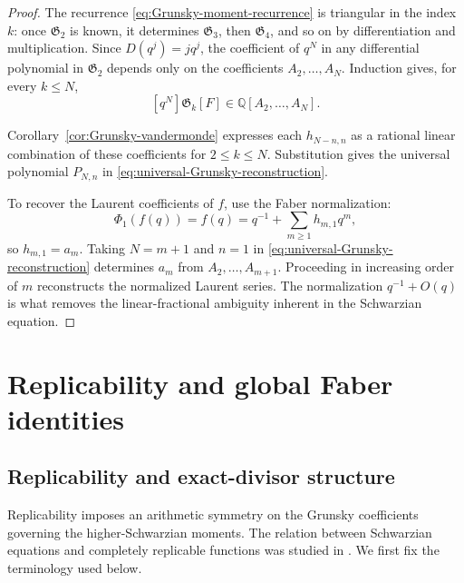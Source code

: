 \documentclass[11pt]{amsart}
\theoremstyle{definition}
\theoremstyle{remark}
\numberwithin{equation}{section}
\begin{document}
\begin{proof}
The recurrence \eqref{eq:Grunsky-moment-recurrence} is triangular in the index $k$: once $\mathfrak G_2$ is known, it determines $\mathfrak G_3$, then $\mathfrak G_4$, and so on by differentiation and multiplication. Since $D(q^j)=jq^j$, the coefficient of $q^N$ in any differential polynomial in $\mathfrak G_2$ depends only on the coefficients $A_2,\ldots,A_N$. Induction gives, for every $k\leq N$,
\[
[q^N]\mathfrak G_k[F]\in\mathbb Q[A_2,\ldots,A_N].
\]

Corollary~\ref{cor:Grunsky-vandermonde} expresses each $h_{N-n,n}$ as a rational linear combination of these coefficients for $2\leq k\leq N$. Substitution gives the universal polynomial $P_{N,n}$ in \eqref{eq:universal-Grunsky-reconstruction}.

To recover the Laurent coefficients of $f$, use the Faber normalization:
\[
\Phi_1(f(q))=f(q)=q^{-1}+\sum_{m\geq1}h_{m,1}q^m,
\]
so $h_{m,1}=a_m$. Taking $N=m+1$ and $n=1$ in \eqref{eq:universal-Grunsky-reconstruction} determines $a_m$ from $A_2,\ldots,A_{m+1}$. Proceeding in increasing order of $m$ reconstructs the normalized Laurent series. The normalization $q^{-1}+O(q)$ is what removes the linear-fractional ambiguity inherent in the Schwarzian equation.
\end{proof}

\section{Replicability and global Faber identities}\label{sec:replicability}

\subsection{Replicability and exact-divisor structure}
Replicability imposes an arithmetic symmetry on the Grunsky coefficients governing the higher-Schwarzian moments. The relation between Schwarzian equations and completely replicable functions was studied in \cite{elbasraoui-mckay}. We first fix the terminology used below.
\end{document}
